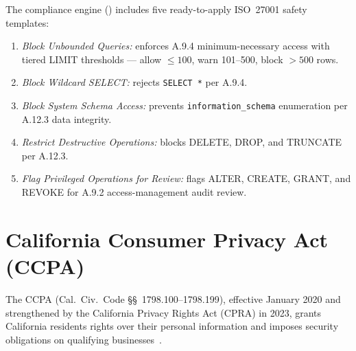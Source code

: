The compliance engine () includes five ready-to-apply ISO~27001 safety templates:
\begin{enumerate}
    \item \textit{Block Unbounded Queries:} enforces A.9.4 minimum-necessary access with tiered LIMIT thresholds --- allow $\leq 100$, warn 101--500, block $> 500$ rows.
    \item \textit{Block Wildcard SELECT:} rejects \texttt{SELECT *} per A.9.4.
    \item \textit{Block System Schema Access:} prevents \texttt{information\_schema} enumeration per A.12.3 data integrity.
    \item \textit{Restrict Destructive Operations:} blocks DELETE, DROP, and TRUNCATE per A.12.3.
    \item \textit{Flag Privileged Operations for Review:} flags ALTER, CREATE, GRANT, and REVOKE for A.9.2 access-management audit review.
\end{enumerate}

\section{California Consumer Privacy Act (CCPA)}

The CCPA (Cal.\ Civ.\ Code \S\S~1798.100--1798.199), effective January 2020 and strengthened by the California Privacy Rights Act (CPRA) in 2023, grants California residents rights over their personal information and imposes security obligations on qualifying businesses~\cite{ccpa-2018}.

